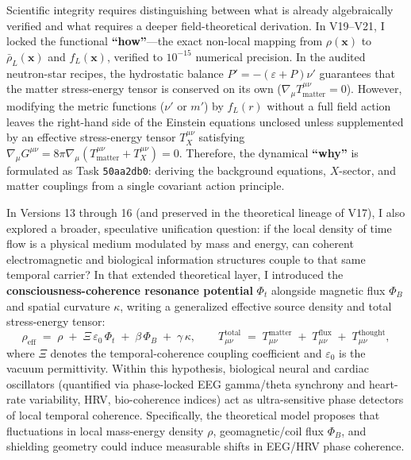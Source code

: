 \documentclass[10pt,a4paper]{article}
\begin{document}
\par
Scientific integrity requires distinguishing between what is already algebraically verified and what requires a deeper field-theoretical derivation. In V19--V21, I locked the functional \textbf{``how''}---the exact non-local mapping from $\rho(\mathbf{x})$ to $\bar{\rho}_L(\mathbf{x})$ and $f_L(\mathbf{x})$, verified to $10^{-15}$ numerical precision. In the audited neutron-star recipes, the hydrostatic balance $P' = -(\varepsilon+P)\nu'$ guarantees that the matter stress-energy tensor is conserved on its own ($\nabla_\mu T^{\mu\nu}_{\text{matter}} = 0$). However, modifying the metric functions ($\nu'$ or $m'$) by $f_L(r)$ without a full field action leaves the right-hand side of the Einstein equations unclosed unless supplemented by an effective stress-energy tensor $T^{\mu\nu}_X$ satisfying $\nabla_\mu G^{\mu\nu} = 8\pi\nabla_\mu(T^{\mu\nu}_{\text{matter}} + T^{\mu\nu}_X) = 0$. Therefore, the dynamical \textbf{``why''} is formulated as Task \texttt{50aa2db0}: deriving the background equations, $X$-sector, and matter couplings from a single covariant action principle.

\par
In Versions 13 through 16 (and preserved in the theoretical lineage of V17), I also explored a broader, speculative unification question: if the local density of time flow is a physical medium modulated by mass and energy, can coherent electromagnetic and biological information structures couple to that same temporal carrier? In that extended theoretical layer, I introduced the \textbf{consciousness-coherence resonance potential} $\Phi_t$ alongside magnetic flux $\Phi_B$ and spatial curvature $\kappa$, writing a generalized effective source density and total stress-energy tensor:
\begin{equation}
  \rho_{\text{eff}} \;=\; \rho \;+\; \Xi\,\varepsilon_0\,\Phi_t \;+\; \beta\,\Phi_B \;+\; \gamma\,\kappa, \qquad
  T_{\mu\nu}^{\text{total}} \;=\; T_{\mu\nu}^{\text{matter}} \;+\; T_{\mu\nu}^{\text{flux}} \;+\; T_{\mu\nu}^{\text{thought}},
\end{equation}
where $\Xi$ denotes the temporal-coherence coupling coefficient and $\varepsilon_0$ is the vacuum permittivity. Within this hypothesis, biological neural and cardiac oscillators (quantified via phase-locked EEG gamma/theta synchrony and heart-rate variability, HRV, bio-coherence indices) act as ultra-sensitive phase detectors of local temporal coherence. Specifically, the theoretical model proposes that fluctuations in local mass-energy density $\rho$, geomagnetic/coil flux $\Phi_B$, and shielding geometry could induce measurable shifts in EEG/HRV phase coherence.
\end{document}
